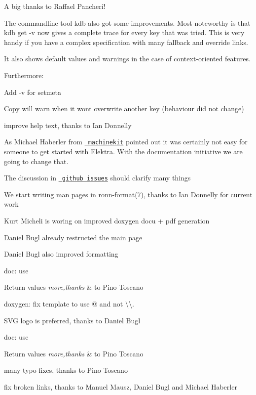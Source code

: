 A big thanks to Raffael Pancheri!

The commandline tool {\ttfamily kdb} also got some improvements. Most noteworthy is that {\ttfamily kdb get -\/v} now gives a complete trace for every key that was tried. This is very handy if you have a complex specification with many fallback and override links.

It also shows default values and warnings in the case of context-\/oriented features.

Furthermore\+:


\begin{DoxyItemize}
\item Add {\ttfamily -\/v} for setmeta
\item Copy will warn when it won\textquotesingle{}t overwrite another key (behaviour did not change)
\item improve help text, thanks to Ian Donnelly
\end{DoxyItemize}

As Michael Haberler from \href{http://www.machinekit.io/}{\texttt{ machinekit}} pointed out it was certainly not easy for someone to get started with Elektra. With the documentation initiative we are going to change that.


\begin{DoxyItemize}
\item The discussion in \href{https://git.libelektra.org/issues}{\texttt{ github issues}} should clarify many things
\item We start writing man pages in ronn-\/format(7), thanks to Ian Donnelly for current work
\item Kurt Micheli is woring on improved doxygen docu + pdf generation
\item Daniel Bugl already restructed the main page
\item Daniel Bugl also improved formatting
\item doc\+: use
\begin{DoxyRetVals}{Return values}
{\em more,thanks} & to Pino Toscano\\
\hline
\end{DoxyRetVals}

\item doxygen\+: fix template to use {\ttfamily @} and not {\ttfamily \textbackslash{}\textbackslash{}}.
\item S\+VG logo is preferred, thanks to Daniel Bugl
\item doc\+: use
\begin{DoxyRetVals}{Return values}
{\em more,thanks} & to Pino Toscano\\
\hline
\end{DoxyRetVals}

\item many typo fixes, thanks to Pino Toscano
\item fix broken links, thanks to Manuel Mausz, Daniel Bugl and Michael Haberler
\end{DoxyItemize}

